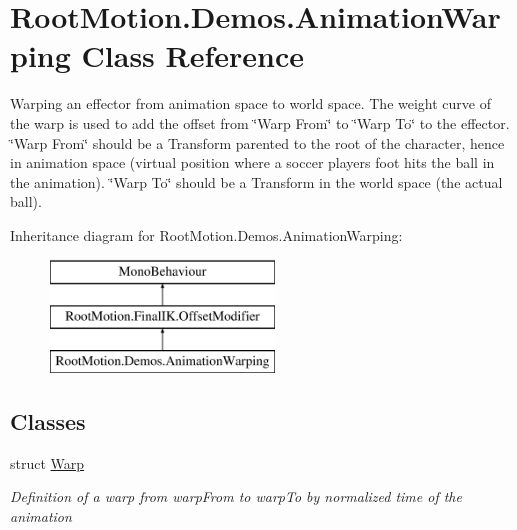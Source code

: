 \hypertarget{class_root_motion_1_1_demos_1_1_animation_warping}{}\section{Root\+Motion.\+Demos.\+Animation\+Warping Class Reference}
\label{class_root_motion_1_1_demos_1_1_animation_warping}


Warping an effector from animation space to world space. The weight curve of the warp is used to add the offset from \char`\"{}\+Warp From\char`\"{} to \char`\"{}\+Warp To\char`\"{} to the effector. \char`\"{}\+Warp From\char`\"{} should be a Transform parented to the root of the character, hence in animation space (virtual position where a soccer player\textquotesingle{}s foot hits the ball in the animation). \char`\"{}\+Warp To\char`\"{} should be a Transform in the world space (the actual ball).  


Inheritance diagram for Root\+Motion.\+Demos.\+Animation\+Warping\+:\begin{figure}[H]
\begin{center}
\leavevmode
\includegraphics[height=3.000000cm]{class_root_motion_1_1_demos_1_1_animation_warping}
\end{center}
\end{figure}
\subsection*{Classes}
\begin{DoxyCompactItemize}
\item 
struct \mbox{\hyperlink{struct_root_motion_1_1_demos_1_1_animation_warping_1_1_warp}{Warp}}
\begin{DoxyCompactList}\small\item\em Definition of a warp from \textquotesingle{}warp\+From\textquotesingle{} to \textquotesingle{}warp\+To\textquotesingle{} by normalized time of the animation \end{DoxyCompactList}\end{DoxyCompactItemize}

